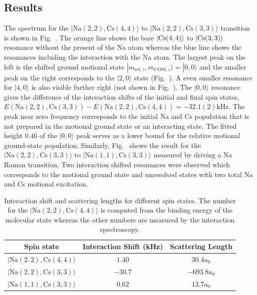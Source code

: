 \subsection{Results}
\label{ch:interaction-shift:result}

The spectrum for the $|\mathrm{Na(2, 2),Cs(4, 4)}\rangle$ to $|\mathrm{Na(2, 2),Cs(3, 3)}\rangle$
transition is shown in Fig.~\todo{}.
The orange line shows the bare $|\mathrm{Cs}(4, 4)\rangle$ to $|\mathrm{Cs}(3, 3)\rangle$ resonance without
the present of the Na atom whereas the blue line shows the resonances
including the interaction with the Na atom.
The largest peak on the left is the shifted ground motional state
$|m_{\mathrm{rel},z},m_{\mathrm{COM},z}\rangle = |0,0\rangle$ and the smaller peak on the right
corresponds to the $|2,0\rangle$ state (Fig.~\todo{}).
A even smaller resonance for $|4,0\rangle$ is also visible further right (not shown in Fig.~\todo{}).
The $|0,0\rangle$ resonance gives the difference of the interaction shifts
of the initial and final spin states,
$E(\mathrm{Na(2, 2),Cs(3, 3)}) - E(\mathrm{Na(2, 2),Cs(4, 4)})=-32.1(2) \mathrm{kHz}$.
The peak near zero frequency corresponds to the initial Na and Cs population that is not prepared
in the motional ground state or an interacting state.
The fitted height $0.46$ of the $|0,0\rangle$ peak serves as a lower bound for
the relative motional ground-state population.
Similarly, Fig.~\todo{} shows the result for
the $|\mathrm{Na(2, 2),Cs(3, 3)}\rangle$ to $|\mathrm{Na(1, 1),Cs(3, 3)}\rangle$
measured by driving a Na Raman transition.
Two interaction shifted resonances were observed which corresponds to
the motional ground state and unresolved states with two total Na and Cs motional excitation.

\begin{table}
  \centering
  \begin{tabular}{|c|c|c|}
    \hline
    Spin state&Interaction Shift (kHz)&Scattering Length\\\hline
    $|\mathrm{Na(2, 2),Cs(4, 4)}\rangle$&$1.40$&$30.4a_0$\\\hline
    $|\mathrm{Na(2, 2),Cs(3, 3)}\rangle$&$-30.7$&$-693.8a_0$\\\hline
    $|\mathrm{Na(1, 1),Cs(3, 3)}\rangle$&$0.62$&$13.7a_0$\\\hline
  \end{tabular}
  \caption[Interaction shift and scattering lengths.]{
    Interaction shift and scattering lengths for different spin states.
    The number for the $|\mathrm{Na(2, 2),Cs(4, 4)}\rangle$ is computed from
    the binding energy of the molecular state whereas the other numbers are
    measured by the interaction spectroscopy.
    \label{table:interaction-shift:results}}
\end{table}

